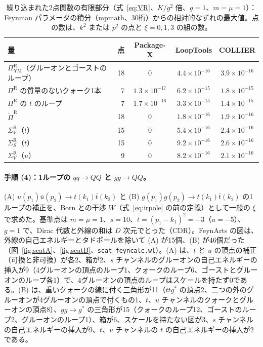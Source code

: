\documentclass[a4paper,10pt]{ltjsarticle}
\begin{document}
\begin{table}[tbp]
\centering\small
\caption{繰り込まれた2点関数の有限部分（式~\eqref{eq:VR}、$K/g^2$ 倍、$g=1$、$m=\mu=1$）：Feynman パラメータの積分（mpmath、30桁）からの相対的なずれの最大値。点の数は、$k^2$ または $p^2$ の点と $\xi=0,1,3$ の組の数。}
\label{tab:oneloop}
\begin{tabular}{lrccc}
\toprule
量 & 点 & Package-X & LoopTools & COLLIER \\
\midrule
$\Pi_{\mathrm{YM}}^{\mathrm R}$（グルーオンとゴーストのループ） & 18 & $0$ & $4.4\times10^{-16}$ & $3.9\times10^{-16}$ \\
$\Pi^{\mathrm R}$ の質量のないクォーク1本 & 7 & $1.3\times10^{-17}$ & $6.2\times10^{-15}$ & $1.8\times10^{-15}$ \\
$\Pi^{\mathrm R}$ の $t$ のループ & 7 & $1.7\times10^{-16}$ & $3.3\times10^{-15}$ & $1.4\times10^{-15}$ \\
$\tilde\Pi^{\mathrm R}$ & 18 & $0$ & $1.8\times10^{-16}$ & $1.9\times10^{-16}$ \\
$\Sigma_V^{\mathrm R}$（$t$） & 15 & $0$ & $5.4\times10^{-16}$ & $2.4\times10^{-16}$ \\
$\Sigma_S^{\mathrm R}$（$t$） & 15 & $0$ & $9.2\times10^{-16}$ & $2.6\times10^{-16}$ \\
$\Sigma_V^{\mathrm R}$（$u$） & 9 & $0$ & $8.2\times10^{-16}$ & $2.1\times10^{-16}$ \\
\bottomrule
\end{tabular}
\end{table}

\paragraph{手順 (4)：1ループの $q\bar q\to Q\bar Q$ と $gg\to Q\bar Q$。}(A) $u(p_1)\bar u(p_2)\to t(k_1)\bar t(k_2)$ と (B) $g(p_1)g(p_2)\to t(k_1)\bar t(k_2)$ の1ループの補正を、Born との干渉 $W$（式~\eqref{eq:irpole} の前の定義）として一般の $\xi$ で求めた。基準点は $m=\mu=1$、$s=10$、$t=(p_1-k_1)^2=-3$（$u=-5$）、$g=1$ で、Dirac 代数と外線の和は $D$ 次元でとった（CDR）。FeynArts の図は、外線の自己エネルギーとタドポールを除いて (A) が15個、(B) が46個だった（図~\ref{fig:scatA}、\ref{fig:scatB}、\texttt{scat\_feyncalc.wl}）。(A) は、$t$ と $u$ の頂点の補正（可換と非可換）が各2、箱が2、$s$ チャンネルのグルーオンの自己エネルギーの挿入が9（4グルーオンの頂点のループ1、クォークのループ6、ゴーストとグルーオンのループ各1）で、4グルーオンの頂点のループはスケールを持たず0である。(B) は、重いクォークの線に付く三角形が11（$t\bar tg^*$ の頂点2、二つの外のグルーオンが4グルーオンの頂点で付くもの1、$t$、$u$ チャンネルのクォークとグルーオンの頂点8）、$gg\to g^*$ の三角形が15（クォークのループ12、ゴーストのループ2、グルーオンのループ1）、箱が6、スケールを持たない図が3、$s$ チャンネルの自己エネルギーの挿入が9、$t$、$u$ チャンネルの $t$ の自己エネルギーの挿入が2である。
\end{document}
